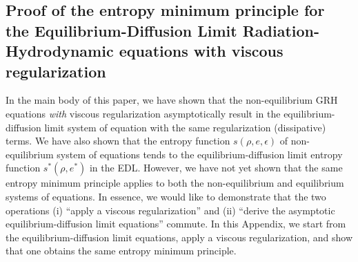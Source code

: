 \documentclass[review]{elsarticle}
\begin{document}
\begin{appendices}
\section{Proof of the entropy minimum principle for the Equilibrium-Diffusion Limit Radiation-Hydrodynamic equations with viscous regularization}
\label{app:appendixB}

In the main body of this paper, we have shown that the non-equilibrium GRH equations \emph{with} viscous regularization asymptotically result in the equilibrium-diffusion limit system of equation with the same regularization (dissipative) terms. We have also shown that the entropy function $s(\rho, e, \epsilon)$ of non-equilibrium system of equations tends to the equilibrium-diffusion limit entropy function $s^*(\rho, e^*)$ in the EDL. However, we have not yet shown that the same entropy minimum principle applies to both the non-equilibrium and equilibrium systems of equations. In essence, we would like to demonstrate that the two operations (i) ``apply a viscous regularization'' and (ii) ``derive the asymptotic equilibrium-diffusion limit equations'' commute. In this Appendix, we start from the equilibrium-diffusion limit equations, apply a viscous regularization, and show that one obtains the same entropy minimum principle. 


\end{appendices}
\end{document}
